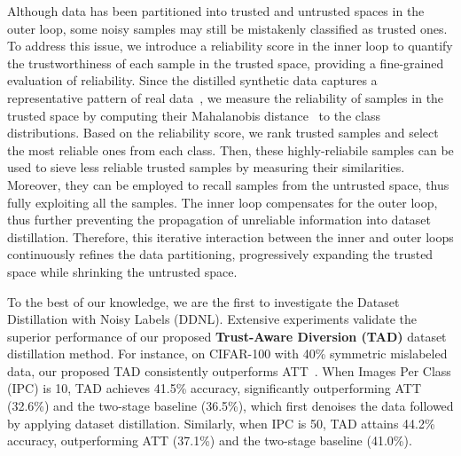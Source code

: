 Although data has been partitioned into trusted and untrusted spaces in the outer loop, some noisy samples may still be mistakenly classified as trusted ones.
To address this issue, we introduce a reliability score in the inner loop to quantify the trustworthiness of each sample in the trusted space, providing a fine-grained evaluation of reliability.
Since the distilled synthetic data captures a representative pattern of real data~\cite{li2024prioritize, guo2024lossless}, we measure the reliability of samples in the trusted space by computing their Mahalanobis distance~\cite{de2000mahalanobis} to the class distributions.
Based on the reliability score, we rank trusted samples and select the most reliable ones from each class.
Then, these highly-reliabile samples can be used to sieve less reliable trusted samples by measuring their similarities. 
Moreover, they can be employed to recall samples from the untrusted space, thus fully exploiting all the samples.
The inner loop compensates for the outer loop, thus further preventing the propagation of unreliable information into dataset distillation.
Therefore, this iterative interaction between the inner and outer loops continuously refines the data partitioning, progressively expanding the trusted space while shrinking the untrusted space.


To the best of our knowledge, we are the first to investigate the Dataset Distillation with Noisy Labels (DDNL). 
Extensive experiments validate the superior performance of our proposed \textbf{Trust-Aware Diversion (TAD)} dataset distillation method.
For instance, on CIFAR-100 with 40\% symmetric mislabeled data, our proposed TAD consistently outperforms ATT~\cite{liu2024dataset}.
When Images Per Class (IPC) is 10, TAD achieves 41.5\% accuracy, significantly outperforming ATT (32.6\%) and the two-stage baseline (36.5\%), which first denoises the data followed by applying dataset distillation.
Similarly, when IPC is 50, TAD attains 44.2\% accuracy, outperforming ATT (37.1\%) and the two-stage baseline (41.0\%).

